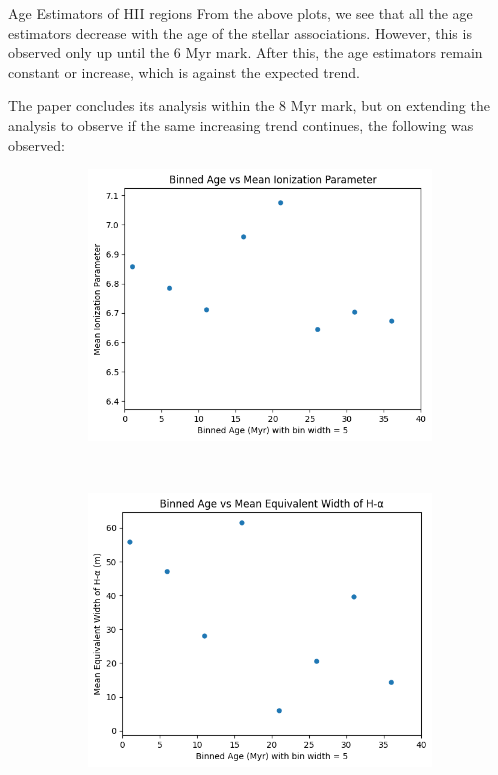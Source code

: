 \documentclass{beamer}
\begin{document}
\begin{frame}{Age Estimators of HII regions}
    From the above plots, we see that all the age estimators decrease with the age of the stellar associations. However, this is observed only up until the 6 Myr mark. After this, the age estimators remain constant or increase, which is against the expected trend. 

    The paper concludes its analysis within the 8 Myr mark, but on extending the analysis to observe if the same increasing trend continues, the following was observed: 

    \begin{figure}
        \centering
        \begin{subfigure}{0.45\textwidth}
            \includegraphics[scale = 0.3]{image22.png}
            \label{fig:image19}
        \end{subfigure}
        ~
        \begin{subfigure}{0.45\textwidth}
            \includegraphics[scale = 0.3]{image23.png}
            \label{fig:image20}
        \end{subfigure}
        
    \end{figure}
\end{frame}
\end{document}
